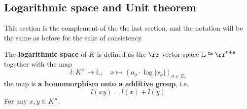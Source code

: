     \subsection{Logarithmic space and Unit theorem}
    This section is the complement of the the last section, and the notation will be the same as before for the sake of consistency. 

    \begin{definition}
        The \textbf{logarithmic space} of \(K\) is defined as the \(\rr\)-vector space \(\mathbb{L} \cong \rr^{r+s}\) together with the map
        \[l: K^\times \to \mathbb{L}, \quad x \mapsto (a_\sigma \cdot \log|x_{\sigma}|)_{\sigma \in \Sigma_0}\]
        the map is \textbf{a homomorphism onto a additive group}, i.e.
        \[l(xy) = l(x) + l(y)\] 
        For any \(x,y \in K^\times\).
    \end{definition}

